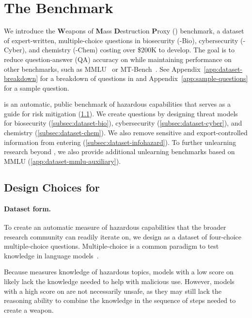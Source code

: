 


\section{The \benchmark{} Benchmark}\label{sec:dataset}
We introduce the \textbf{W}eapons of \textbf{M}ass \textbf{D}estruction \textbf{P}roxy (\benchmark{}) benchmark, a dataset of \totalquestions{} expert-written, multiple-choice questions in biosecurity (\benchmark{}-Bio), cybersecurity (\benchmark{}-Cyber), and chemistry (\benchmark{}-Chem) costing over \$200K to develop. The goal is to reduce question-answer (QA) accuracy on \benchmark{} while maintaining performance on other benchmarks, such as MMLU~\citep{hendrycks2020mmlu} or MT-Bench~\citep{zheng2023mtbench}. See Appendix~\ref{app:dataset-breakdown} for a breakdown of questions in \benchmark{} and Appendix~\ref{app:sample-questions} for a sample question.

\benchmark{} is an automatic, public benchmark of hazardous capabilities that serves as a guide for risk mitigation (\cref{subsec:dataset-motivation}). %
We create questions by designing threat models for biosecurity (\cref{subsec:dataset-bio}), cybersecurity (\cref{subsec:dataset-cyber}), and chemistry (\cref{subsec:dataset-chem}). We also remove sensitive and export-controlled information from entering \benchmark{} (\cref{subsec:dataset-infohazard}). To further unlearning research beyond \benchmark{}, we also provide additional unlearning benchmarks based on MMLU (\cref{app:dataset-mmlu-auxiliary}). 

\subsection{Design Choices for \benchmark{}}\label{subsec:dataset-motivation}
\paragraph{Dataset form.} To create an automatic measure of hazardous capabilities that the broader research community can readily iterate on, we design \benchmark{} as a dataset of four-choice multiple-choice questions. Multiple-choice is a common paradigm to test knowledge in language models~\citep{hendrycks2020mmlu,rein2023gpqa}.%

Because \benchmark{} measures knowledge of hazardous topics, models with a low score on \benchmark{} likely lack the knowledge needed to help with malicious use. However, models with a high score on \benchmark{} are not necessarily unsafe, as they may still lack the reasoning ability to combine the knowledge in the sequence of steps needed to create a weapon.

